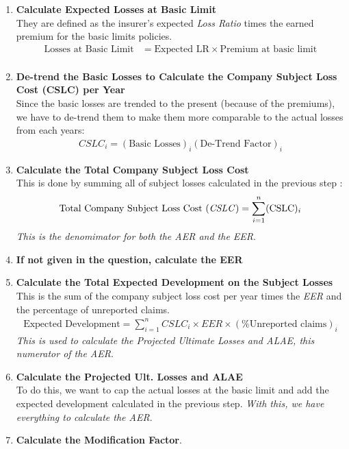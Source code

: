 \documentclass[11pt, english]{memoir}
\numberwithin{definition}{section}
\begin{document}
\begin{enumerate}
	\item \textbf{Calculate Expected Losses at Basic Limit}\\
	They are defined as the insurer's expected \emph{Loss Ratio} times the earned premium for the basic limits policies. 
	\begin{align*}
	\text{Losses at Basic Limit} &= \text{Expected LR} \times \text{Premium at basic limit}\\
	\end{align*}
	
	\item  \textbf{De-trend the Basic Losses to Calculate the Company Subject Loss Cost (CSLC) per Year}\\
	Since the basic losses are trended to the present (because of the premiums), we have to de-trend them to make them more comparable to the actual losses from each years: 
	\begin{align*}
	CSLC_{i} = (\text{Basic Losses})_{i}(\text{De-Trend Factor})_{i}
	\end{align*}
	
	\item \textbf{Calculate the Total Company Subject Loss Cost}\\
	This is done by summing all of subject losses calculated in the previous step :
	\begin{align*}
	\text{Total Company Subject Loss Cost (\emph{CSLC})} = \sum_{i = 1}^{n} (\text{CSLC})_{i} 
	\end{align*}
	\emph{This is the denomimator for both the AER and the EER}.\\
	
	\item \textbf{If not given in the question, calculate the EER}\\
	
	\item \textbf{Calculate the Total Expected Development on the Subject Losses}\\
	This is the sum of the company subject loss cost per year times the \emph{EER} and the percentage of unreported claims.
	\begin{align*}
		\text{Expected Development} = \sum_{i=1}^{n}CSLC_{i}\times EER \times (\% \text{Unreported claims})_{i} 	
	\end{align*}
	\emph{This is used to calculate the Projected Ultimate Losses and ALAE, this numerator of the AER}. \\
	
	\item \textbf{Calculate the Projected Ult. Losses and ALAE}\\
	To do this, we want to cap the actual losses at the basic limit and add the expected development calculated in the previous step. \emph{With this, we have everything to calculate the AER}. \\
	
	\item \textbf{Calculate the Modification Factor}.
\end{enumerate}
\end{document}
